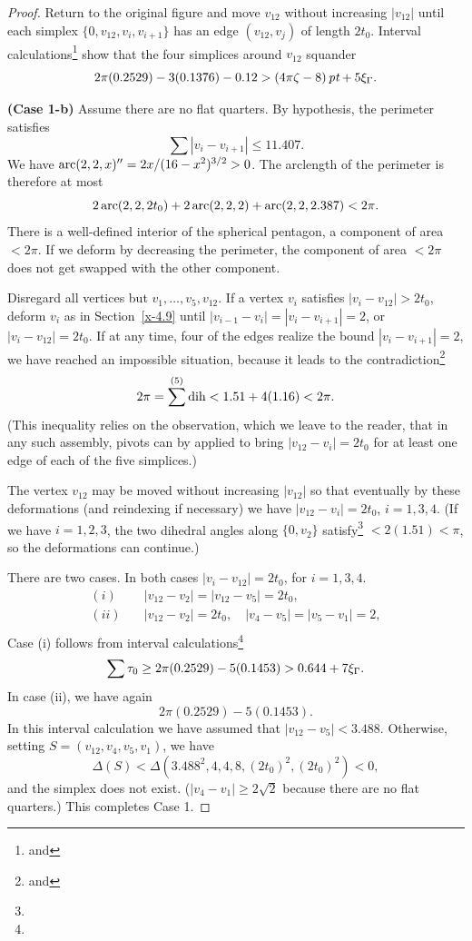 \begin{proof}
Return to the original figure and move $v_{12}$ without increasing
$|v_{12}|$ until each simplex $\{0,v_{12},v_i,v_{i+1}\}$ has an edge
$(v_{12},v_j)$ of length $2t_0$. Interval
calculations\footnote{ and } show
that the four simplices around $v_{12}$ squander
    $$2\pi(0.2529)-3(0.1376)-0.12 > (4\pi\zeta-8)\,\hbox{\it pt} + 5\xi_\Gamma.$$

{\bf (Case 1-b)} Assume there are no flat quarters. By hypothesis,
the perimeter satisfies $$\sum|v_i-v_{i+1}|\le 11.407.$$ We have
$\operatorname{arc}(2,2,x)'' = 2x/(16-x^2)^{3/2} >0$. The arclength of the
perimeter is therefore at most
$$2\operatorname{arc}(2,2,2t_0) + 2\operatorname{arc}(2,2,2) + \operatorname{arc}(2,2,2.387) <  2\pi.$$
There is a well-defined interior of the spherical pentagon, a
component of area $<2\pi$.  If we deform by decreasing the
perimeter, the component of area $<2\pi$ does not get swapped with
the other component.

Disregard all vertices but $v_1,\ldots,v_5,v_{12}$.  If a vertex
$v_i$ satisfies  $|v_i-v_{12}|>2t_0$, deform $v_i$ as in
Section~\ref{x-4.9} until $|v_{i-1}-v_{i}|=|v_i-v_{i+1}|=2$, or
$|v_i-v_{12}|=2t_0$. If at any time, four of the edges realize the
bound $|v_i-v_{i+1}|=2$, we have reached an impossible situation,
because it leads to the contradiction\footnote{
and }
    $$2\pi = \sum^{(5)}\operatorname{dih} < 1.51 + 4 (1.16) < 2\pi.$$
(This inequality relies on the observation, which we leave to the
reader, that in any such assembly, pivots can by applied to bring
$|v_{12}-v_i|=2t_0$ for at least one edge of each of the five
simplices.)



The vertex $v_{12}$ may be moved without increasing $|v_{12}|$ so
that eventually by these deformations (and reindexing if
necessary) we have $|v_{12}-v_i|=2t_0$, $i=1,3,4$. (If we have
$i=1,2,3$, the two dihedral angles along $\{0,v_2\}$
satisfy\footnote{} $<2(1.51)<\pi$, so the
deformations can continue.)



There are two cases. In both cases $|v_i-v_{12}|=2t_0$, for
$i=1,3,4$.
$$
\begin{array}{lll}
(i)\quad &|v_{12}-v_2|=|v_{12}-v_5|=2t_0,\\
(ii)\quad &|v_{12}-v_2|=2t_0,\quad |v_4-v_5|=|v_5-v_1|=2,\\
\end{array}
$$
Case (i) follows from interval
calculations\footnote{}
$$
\sum\tau_0 \ge 2\pi(0.2529) - 5 (0.1453) > 0.644+7\xi_\Gamma.
$$
In case (ii), we have again
    $$2\pi(0.2529)-5 (0.1453).$$
In this interval calculation we have assumed that
$|v_{12}-v_5|<3.488$. Otherwise, setting $S=(v_{12},v_4,v_5,v_1)$,
we have
    $$\Delta(S) < \Delta(3.488^2,4,4,8,(2t_0)^2,(2t_0)^2)<0,$$
and the simplex does not exist.  ($|v_4-v_1|\ge2\sqrt2$ because
there are no flat quarters.) This completes Case 1.


\end{proof}
